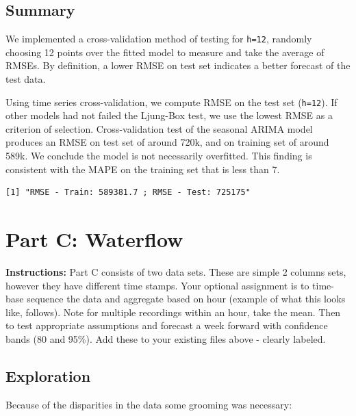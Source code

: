 \documentclass[openany]{book}
\renewenvironment{quote}{\begin{myquote}}{\end{myquote}}
\begin{document}
\hypertarget{summary-1}{%
\section{Summary}\label{summary-1}}

We implemented a cross-validation method of testing for \texttt{h=12},
randomly choosing 12 points over the fitted model to measure and take
the average of RMSEs. By definition, a lower RMSE on test set indicates
a better forecast of the test data.

Using time series cross-validation, we compute RMSE on the test set
(\texttt{h=12}). If other models had not failed the Ljung-Box test, we
use the lowest RMSE as a criterion of selection. Cross-validation test
of the seasonal ARIMA model produces an RMSE on test set of around 720k,
and on training set of around 589k. We conclude the model is not
necessarily overfitted. This finding is consistent with the MAPE on the
training set that is less than 7.

\begin{verbatim}
[1] "RMSE - Train: 589381.7 ; RMSE - Test: 725175"
\end{verbatim}

\hypertarget{part-c-waterflow}{%
\chapter{Part C: Waterflow}\label{part-c-waterflow}}

\begin{quote}
\textbf{Instructions:} Part C consists of two data sets. These are
simple 2 columns sets, however they have different time stamps. Your
optional assignment is to time-base sequence the data and aggregate
based on hour (example of what this looks like, follows). Note for
multiple recordings within an hour, take the mean. Then to test
appropriate assumptions and forecast a week forward with confidence
bands (80 and 95\%). Add these to your existing files above - clearly
labeled.
\end{quote}

\hypertarget{exploration-2}{%
\section{Exploration}\label{exploration-2}}

Because of the disparities in the data some grooming was necessary:
\end{document}
